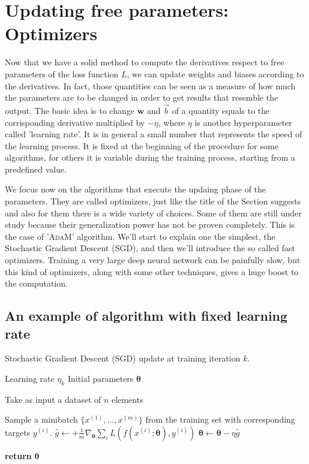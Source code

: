 \section{Updating free parameters: Optimizers}
\label{sec:OPTIMIZERS}
Now that we have a solid method to compute the derivatives respect to free parameters of the loss function $L$, we can update weights and biases according to the derivatives. In fact, those quantities can be seen as a measure of how much the parameters are to be changed in order to get results that resemble the output. The basic idea is to change $\mathbf{w}$ and $\vec{b}$ of a quantity equals to the corrisponding derivative multiplied by $-\eta$, where $\eta$ is another hyperparameter called 'learning rate'. It is in general a small number that represents the speed of the learning process. It is fixed at the beginning of the procedure for some algorithms, for others it is variable during the training process, starting from a predefined value.

We focus now on the algorithms that execute the updaing phase of the parameters. They are called optimizers, just like the title of the Section suggests and also for them there is a wide variety of choices. Some of them are still under study because their generalization power has not be proven completely. This is the case of '\textsc{AdaM}' algorithm. We'll start to explain one the simplest, the Stochastic Gradient Descent (SGD), and then we'll introduce the so called fast optimizers. Training a very large deep neural network can be painfully slow, but this kind of optimizers, along with some other techniques, gives a huge boost to the computation.

\subsection{An example of algorithm with fixed learning rate}
\begin{algorithm}[H]
\caption{Stochastic Gradient Descent (SGD) update at training iteration $k$.}\label{alg:SGD}
\begin{algorithmic}[1]
\Require Learning rate $\eta_{k}$
\Require Initial parameters $\bm{\theta}$

 \Comment Take as input a dataset of $n$ elements

\State Sample a minibatch $\{x^{(1)},\dots,x^{(m)}\}$ from the training set with corresponding targets $y^{(i)}$.
\State $\hat{g} \gets + \frac{1}{m} \nabla_{\bm{\theta}} \sum_{i} L(f(x^{(i)};\bm{\theta}), y^{(i)})$ 
\State $\bm{\theta} \gets \bm{\theta} - \eta \hat{g}$
\EndWhile

\State \textbf{return} $\bm{\theta}$
\EndProcedure
\end{algorithmic}
\end{algorithm}



